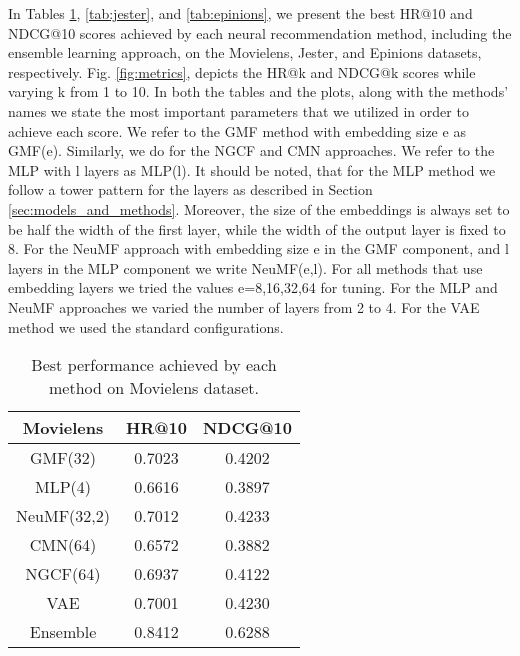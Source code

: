 In Tables \ref{tab:movielens}, \ref{tab:jester}, and \ref{tab:epinions}, we present the best HR@10 and NDCG@10 scores achieved by each neural recommendation method, including the ensemble learning approach, on the Movielens, Jester, and Epinions datasets, respectively.
Fig. \ref{fig:metrics}, depicts the HR@k and NDCG@k scores while varying k from 1 to 10.
In both the tables and the plots, along with the methods' names we state the most important parameters that we utilized in order to achieve each score.
We refer to the GMF method with embedding size e as GMF(e).
Similarly, we do for the NGCF and CMN approaches.
We refer to the MLP with l layers as MLP(l).
It should be noted, that for the MLP method we follow a tower pattern for the layers as described in Section \ref{sec:models_and_methods}.
Moreover, the size of the embeddings is always set to be half the width of the first layer, while the width of the output layer is fixed to 8.
For the NeuMF approach with embedding size e in the GMF component, and l layers in the MLP component we write NeuMF(e,l).
For all methods that use embedding layers we tried the values e=8,16,32,64 for tuning.
For the MLP and NeuMF approaches we varied the number of layers from 2 to 4.
For the VAE method we used the standard configurations.

\begin{table}[h]
    \centering
    \begin{tabular}{c|c|c}
        \hline
        Movielens & HR@10  & NDCG@10 \\
        \hline
        GMF(32)     & 0.7023 & 0.4202  \\
        MLP(4)      & 0.6616 & 0.3897 \\
        NeuMF(32,2) & 0.7012 & 0.4233 \\
        CMN(64)         & 0.6572&  0.3882 \\
        NGCF(64)    & 0.6937 & 0.4122 \\
        VAE         & 0.7001 & 0.4230 \\
        Ensemble    & 0.8412 & 0.6288
    \end{tabular}
    \caption{Best performance achieved by each method on Movielens dataset.}
    \label{tab:movielens}
\end{table}

